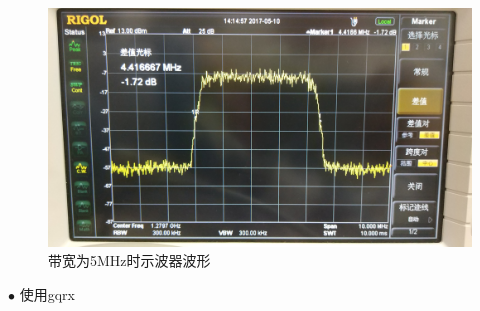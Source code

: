 		\begin{figure}[htp]
			\centering
			\includegraphics[width=13cm]{figures/dvbt_BW_5MHz.jpg}
			\caption{带宽为5MHz时示波器波形}
			\label{fig:dvbt_BW_5MHz}
		\end{figure}
		\par $\bullet$ 使用gqrx
